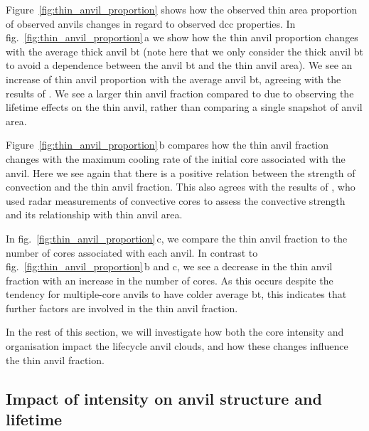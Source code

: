 Figure~\ref{fig:thin_anvil_proportion} shows how the observed thin area proportion of observed anvils changes in regard to observed \acrshort{dcc} properties.
In fig.~\ref{fig:thin_anvil_proportion}\,a we show how the thin anvil proportion changes with the average thick anvil \acrshort{bt} (note here that we only consider the thick anvil \acrshort{bt} to avoid a dependence between the anvil \acrshort{bt} and the thin anvil area).
We see an increase of thin anvil proportion with the average anvil \acrshort{bt}, agreeing with the results of \citet{protopapadaki_upper_2017}.
We see a larger thin anvil fraction compared to \citet{protopapadaki_upper_2017} due to observing the lifetime effects on the thin anvil, rather than comparing a single snapshot of anvil area.

Figure~\ref{fig:thin_anvil_proportion}\,b compares how the thin anvil fraction changes with the maximum cooling rate of the initial core associated with the anvil.
Here we see again that there is a positive relation between the strength of convection and the thin anvil fraction.
This also agrees with the results of \citet{takahashi_relationships_2017}, who used radar measurements of convective cores to assess the convective strength and its relationship with thin anvil area.

In fig.~\ref{fig:thin_anvil_proportion}\,c, we compare the thin anvil fraction to the number of cores associated with each anvil.
In contrast to fig.~\ref{fig:thin_anvil_proportion}\,b and c, we see a decrease in the thin anvil fraction with an increase in the number of cores.
As this occurs despite the tendency for multiple-core anvils to have colder average \acrshort{bt}, this indicates that further factors are involved in the thin anvil fraction.

In the rest of this section, we will investigate how both the core intensity and organisation impact the lifecycle anvil clouds, and how these changes influence the thin anvil fraction.

\subsection{Impact of intensity on anvil structure and lifetime}

